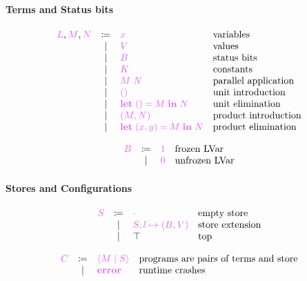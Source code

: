 \documentclass[main.tex]{subfiles}
\begin{document}
\paragraph{Terms and Status bits}
\[
\begin{array}{lcll}
  \tm{L}, \tm{M}, \tm{N}
  & \coloneqq & \tm{x}                        & \text{variables} \\
  & \sep      & \tm{V}                        & \text{values} \\
  & \sep      & \tm{B}                        & \text{status bits}\\
  & \sep      & \tm{K}                        & \text{constants} \\                                              
  & \sep      & \tm{M\;N}                     & \text{parallel application} \\
  & \sep      & \tm{\unit}                    & \text{unit introduction} \\
  & \sep      & \tm{\letunit{M}{N}}           & \text{unit elimination} \\
  & \sep      & \tm{\pair{M}{N}}              & \text{product introduction} \\
  & \sep      & \tm{\letpair{x}{y}{M}{N}}     & \text{product elimination}\\
\end{array}
\]

\[
\begin{array}{lcll}
  \tm{B}
  & \coloneqq & \tm{1}                        & \text{frozen LVar} \\
  & \sep      & \tm{0}                        & \text{unfrozen LVar} \\
\end{array}
\]

\paragraph{Stores and Configurations}
\[
\begin{array}{lcll}
  \tm{S}
  & \coloneqq & \tm{\emptyenv}                & \text{empty store} \\
  & \sep      & \tm{S, l \mapsto (B, V)}      & \text{store extension} \\
  & \sep      & \top                          & \text{top} \\
  \end{array}
\]

\[
\begin{array}{lcll}
  \tm{C}
  & \coloneqq & \tm{\config{M}{S}}            & \text{programs are pairs of
                                                    terms and store} \\
  & \sep      & \tm{\lvarerror}               & \text{runtime crashes} \\
  \end{array}
\]
\end{document}
